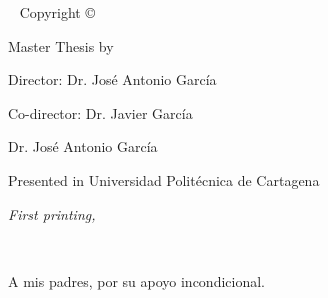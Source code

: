 \newpage
\begin{fullwidth}
~\vfill
\thispagestyle{empty}
\setlength{\parindent}{0pt}
\setlength{\parskip}{.5\baselineskip}
\textsf{Copyright \copyright\ \monthyear\ \thanklessauthor}
\par\textsf{Master Thesis by \thanklessauthor}
\par\textsf{Director: Dr. José Antonio García}
\par\textsf{Co-director: Dr. Javier García}  
\par\textsf{\hspace{1.8cm} Dr. José Antonio García}
\par\textsf{Presented in Universidad Politécnica de Cartagena}
\par\textit{First printing, \monthyear}
\end{fullwidth}

\cleardoublepage
~\vfill
\begin{doublespace}
\noindent%
\nohyphenation
A mis padres, por su apoyo incondicional.
\end{doublespace}
\vfill
\vfill



\tableofcontents



\listoffigures %


\listoftables %


